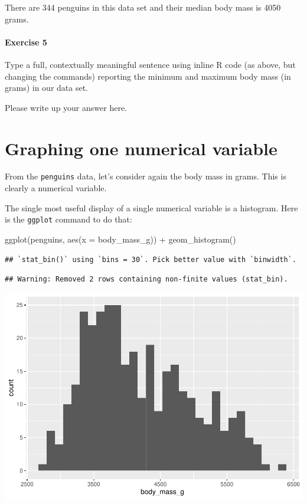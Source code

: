 \documentclass[
]{book}
\newenvironment{Shaded}{\begin{snugshade}}{\end{snugshade}}
\newcommand{\AttributeTok}[1]{\textcolor[rgb]{0.77,0.63,0.00}{#1}}
\newcommand{\FunctionTok}[1]{\textcolor[rgb]{0.00,0.00,0.00}{#1}}
\newcommand{\NormalTok}[1]{#1}
\newcommand{\SpecialCharTok}[1]{\textcolor[rgb]{0.00,0.00,0.00}{#1}}
\begin{document}
There are 344 penguins in this data set and their median body mass is 4050 grams.

\hypertarget{exercise-5-1}{%
\paragraph*{Exercise 5}\label{exercise-5-1}}

Type a full, contextually meaningful sentence using inline R code (as above, but changing the commands) reporting the minimum and maximum body mass (in grams) in our data set.

Please write up your answer here.

\hypertarget{numerical-graphing-one}{%
\section{Graphing one numerical variable}\label{numerical-graphing-one}}

From the \texttt{penguins} data, let's consider again the body mass in grams. This is clearly a numerical variable.

The single most useful display of a single numerical variable is a histogram. Here is the \texttt{ggplot} command to do that:

\begin{Shaded}
\begin{Highlighting}[]
\FunctionTok{ggplot}\NormalTok{(penguins, }\FunctionTok{aes}\NormalTok{(}\AttributeTok{x =}\NormalTok{ body\_mass\_g)) }\SpecialCharTok{+}
    \FunctionTok{geom\_histogram}\NormalTok{()}
\end{Highlighting}
\end{Shaded}

\begin{verbatim}
## `stat_bin()` using `bins = 30`. Pick better value with `binwidth`.
\end{verbatim}

\begin{verbatim}
## Warning: Removed 2 rows containing non-finite values (stat_bin).
\end{verbatim}

\includegraphics{intro_stats_files/figure-latex/unnamed-chunk-97-1.pdf}
\end{document}
